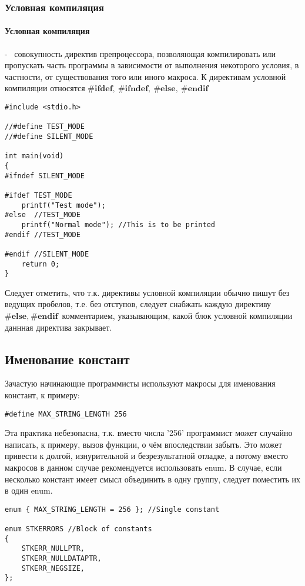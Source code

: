 \documentclass[a4paper]{article}
\begin{document}
\subsubsection{Условная компиляция}

\paragraph{Условная компиляция} - \ совокупность директив препроцессора, позволяющая компилировать или пропускать часть программы в зависимости от выполнения некоторого условия, в частности, от существования того или иного макроса. К директивам условной компиляции относятся $\textbf{\#ifdef},\ \textbf{\#ifndef},\ \textbf{\#else},\ \textbf{\#endif}$
	\begin{lstlisting}[caption={Условная компиляция}]
#include <stdio.h>

//#define TEST_MODE
//#define SILENT_MODE

int main(void)
{
#ifndef SILENT_MODE

#ifdef TEST_MODE
    printf("Test mode");
#else  //TEST_MODE
    printf("Normal mode"); //This is to be printed
#endif //TEST_MODE

#endif //SILENT_MODE
    return 0;
}	
	\end{lstlisting}
	Следует отметить, что т.к. директивы условной компиляции обычно пишут без ведущих пробелов, т.е. без отступов, следует снабжать каждую директиву $\textbf{\#else},\ \textbf{\#endif}$ комментарием, указывающим, какой блок условной компиляции даннная директива закрывает. 
	
\newpage

\subsection{Именование констант}

	Зачастую начинающие программисты используют макросы для именования констант, к примеру:
	\begin{lstlisting}[caption={Именованная константа}]
#define MAX_STRING_LENGTH 256
	\end{lstlisting}
	Эта практика небезопасна, т.к. вместо числа '256' программист может случайно написать, к примеру, вызов функции, о чём впоследствии забыть. Это может привести к долгой, изнурительной и безрезультатной отладке, а потому вместо макросов в данном случае рекомендуется использовать enum. В случае, если несколько констант имеет смысл объединить в одну группу, следует поместить их в один enum.
	\begin{lstlisting}[caption={Enums}]
enum { MAX_STRING_LENGTH = 256 }; //Single constant

enum STKERRORS //Block of constants
{
	STKERR_NULLPTR,
	STKERR_NULLDATAPTR,
	STKERR_NEGSIZE,
};
	\end{lstlisting}
	
\end{document}
